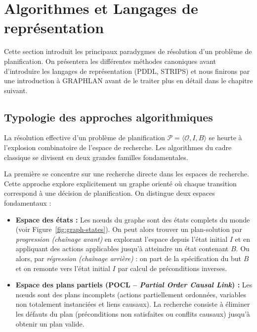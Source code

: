 
\section{Algorithmes et Langages de représentation}

Cette section introduit les principaux paradygmes de résolution d'un problème de planification. On présentera les différentes méthodes canoniques avant d'introduire les langages de représentation (PDDL, STRIPS) et nous finirons par une introduction à GRAPHLAN avant de le traiter plus en détail dans le chapitre suivant. 

\subsection{Typologie des approches algorithmiques}

La résolution effective d'un problème de planification $\mathcal{P} = \langle \mathcal{O}, I, B \rangle$ se heurte à l'explosion combinatoire de l'espace de recherche. Les algorithmes du cadre classique se divisent en deux grandes familles fondamentales.

La première se concentre sur une recherche directe dans les espaces de recherche. 
Cette approche explore explicitement un graphe orienté où chaque transition correspond à une décision de planification. On distingue deux espaces fondamentaux :

\begin{itemize}
    \item \textbf{Espace des états :} Les nœuds du graphe sont des états complets du monde (voir Figure~\ref{fig:graph-states}). On peut alors trouver un plan-solution par \emph{progression (chaînage avant)} en explorant l'espace depuis l'état initial $I$ et en appliquant des actions applicables jusqu'à atteindre un état contenant $B$.
    Ou alors, par \emph{régression (chaînage arrière)} : on part de la spécification du but $B$ et on remonte vers l'état initial $I$ par calcul de préconditions inverses.
    
    \item \textbf{Espace des plans partiels (POCL -- \emph{Partial Order Causal Link}) :} Les nœuds sont des plans incomplets (actions partiellement ordonnées, variables non totalement instanciées et liens causaux). La recherche consiste à éliminer les défauts du plan (préconditions non satisfaites ou conflits causaux) jusqu'à obtenir un plan valide.
\end{itemize}

